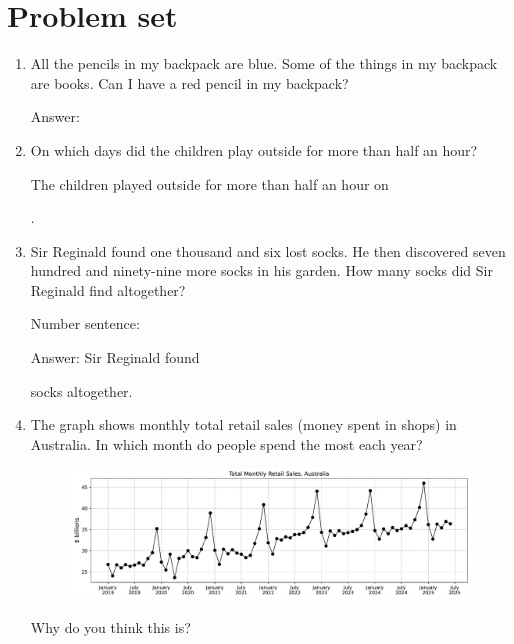 \documentclass{tufte-book}
\begin{document}
\clearpage\section{Problem set }

\begin{enumerate}

\item All the pencils in my backpack are blue. Some of the things in my backpack are books. Can I have a red pencil in my backpack?\medskip\par
Answer: \dotfill\medskip

\item {}
On which days did the children play outside for more than half an hour?\bigskip\par
The children played outside for more than half an hour on \dotfill\bigskip\par\dotfill\bigskip.

\item Sir Reginald found one thousand and six lost socks. He then discovered seven hundred and ninety-nine more socks in his garden. 
How many socks did Sir Reginald find altogether?\medskip\par
Number sentence: \dotfill\medskip\par
Answer: Sir Reginald found 
\dotfill\medskip\par\mbox{}\dotfill\medskip\par\mbox{}\dotfill\bigskip
 socks altogether.

\item The graph shows monthly total retail sales (money spent in shops) in Australia.
In which month do people spend the most each year?\bigskip\par
\dotfill\bigskip\par
\begin{figure}[h]\includegraphics[width=1.3\textwidth]{fig/line_retail_sales.pdf}\end{figure}
Why do you think this is?
\dotfill\bigskip\par
\dotfill\bigskip\par

\end{enumerate}
\end{document}
